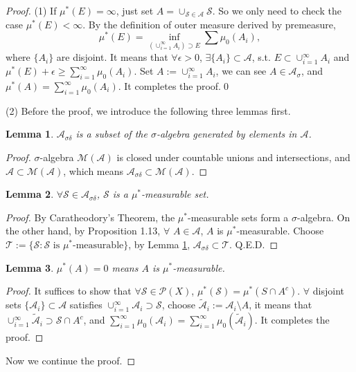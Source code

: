 \documentclass{article}
\newtheorem{lemma}{Lemma}
\newcommand{\cp}[1]{\cup_{#1=1}^{\infty}}
\newcommand{\sm}[1]{\sum_{#1=1}^{\infty}}
\begin{document}
\begin{proof}
    (1) If $\mu^{*}(E)=\infty$, 
    just set $A=\cup_{\mathcal{S}\in\mathcal{A}}\mathcal{S}$. 
    So we only need  to check the case $\mu^{*}(E)<\infty$.
    By the definition of outer measure derived by premeasure,
    \begin{displaymath}
        \mu^{*}(E)=\inf_{(\cp{i}A_{i})\supset E}\sum\mu_{0}(A_{i}),
    \end{displaymath} 
    where $\{A_{i}\}$ are disjoint. 
    It means that $\forall\epsilon>0$, 
    $\exists\{A_{i}\}\subset\mathcal{A}$, 
    s.t. $E\subset\cup_{i=1}^{\infty}A_{i}$ 
    and $\mu^{*}(E)+\epsilon\ge\sum_{i=1}^{\infty}\mu_{0}(A_{i})$.
    Set $A:=\cp{i}A_{i}$, we can see $A\in\mathcal{A}_{\sigma}$, 
    and $\mu^{*}(A)=\sum_{i=1}^{\infty}\mu_{0}(A_{i})$. 
    It completes the proof.\qed

    (2) Before the proof, we introduce 
    the following three lemmas first. 
    \begin{lemma}
        \label{lem:AsigmadeltaFormSA}
        $\mathcal{A}_{\sigma\delta}$ is a subset of the $\sigma$-algebra 
        generated by elements in $\mathcal{A}$.
    \end{lemma}
    \begin{proof}
        $\sigma$-algebra $\mathcal{M}(\mathcal{A})$ is closed 
        under countable unions and intersections, 
        and $\mathcal{A}\subset\mathcal{M}(\mathcal{A})$, 
        which means 
        $\mathcal{A}_{\sigma\delta}\subset\mathcal{M}(\mathcal{A})$. 
    \end{proof}
    \begin{lemma}
        \label{lem:AsdMS}
        $\forall\mathcal{S}\in\mathcal{A}_{\sigma\delta}$, 
        $\mathcal{S}$ is a $\mu^*$-measurable set.
    \end{lemma}
    \begin{proof}
        By Caratheodory's Theorem, the $\mu^*$-measurable sets 
        form a $\sigma$-algebra. 
        On the other hand, by Proposition 1.13, 
        $\forall$ $A\in\mathcal{A}$, $A$ is $\mu^*$-measurable.
        Choose $\mathcal{T}:=\{\mathcal{S}:\mathcal{S}\text{ is }
        \mu^*\text{-measurable}\}$, 
        by Lemma \ref{lem:AsigmadeltaFormSA}, 
        $\mathcal{A}_{\sigma\delta}\subset\mathcal{T}$. Q.E.D.
    \end{proof}
    \begin{lemma}
        \label{lem:ZeroMeasurable}
        $\mu^{*}(A)=0$ means $A$ is $\mu^{*}$-measurable.
    \end{lemma}
    \begin{proof}
        It suffices to show that $\forall\mathcal{S}\in\mathcal{P}(X)$, 
        $\mu^{*}(\mathcal{S})=\mu^{*}(S\cap A^{c})$. 
        $\forall$ disjoint sets $\{\mathcal{A}_{i}\}\subset\mathcal{A}$ 
        satisfies $\cup_{i=1}^{\infty}
        \mathcal{A}_{i}\supset\mathcal{S}$, 
        choose $\tilde{\mathcal{A}}_{i}:=\mathcal{A}_{i}\setminus A$, 
        it means that 
        $\cp{i}\tilde{\mathcal{A}}_{i}\supset\mathcal{S}\cap A^c$, 
        and $\sm{i}\mu_{0}(\mathcal{A}_{i})
        =\sm{i}\mu_{0}(\tilde{\mathcal{A}}_{i})$. 
        It completes the proof.
    \end{proof}
    Now we continue the proof.


\end{proof}
\end{document}
